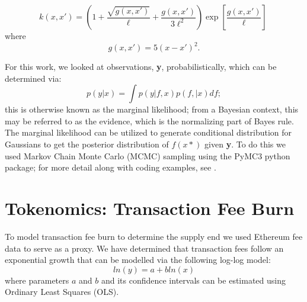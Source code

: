 \documentclass[peerreview]{ieeesyscoin}
\begin{document}
\begin{equation}
k(x,x') = \left( 1 + \dfrac{\sqrt{g(x,x')}}{\ell} + \dfrac{g(x,x')}{3\ell^2}\right)\exp\left[ \dfrac{g(x,x')}{\ell} \right]\ 
\end{equation}
where
\begin{equation}
	g(x,x') = 5(x-x')^2.
\end{equation}

For this work, we looked at observations, \textbf{y}, probabilistically, which can be determined via:
\begin{equation}
p(y|x) = \int p(y | f,x) p (f, |x) df;
\end{equation}
this is otherwise known as the marginal likelihood; from a Bayesian context, this may be referred to as the evidence, which is the normalizing part of Bayes rule. The marginal likelihood can be utilized to generate conditional distribution for Gaussians to get the posterior distribution of $f(x*)$ given \textbf{y}. To do this we used Markov Chain Monte Carlo (MCMC) sampling using the PyMC3 python package; for more detail along with coding examples, see \cite{Fon20}.

\section{Tokenomics: Transaction Fee Burn}
\label{appendix:tx_fee_burn}

To model transaction fee burn to determine the supply end we used Ethereum fee data to serve as a proxy. We have determined that transaction fees follow an exponential growth that can be modelled via the following log-log model:
\begin{equation}
ln(y) = a + bln(x)
\end{equation}
where parameters $a$ and $b$ and its confidence intervals can be estimated using Ordinary Least Squares (OLS).
\end{document}
